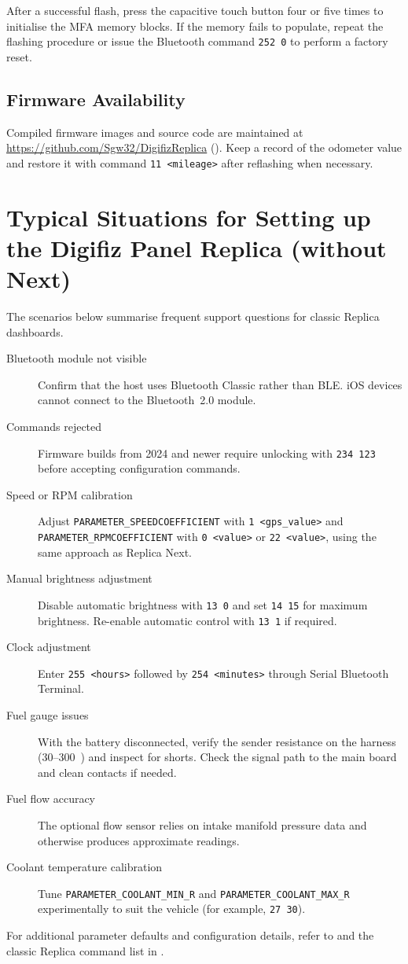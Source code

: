 After a successful flash, press the capacitive touch button four or five times to initialise the MFA memory blocks.
If the memory fails to populate, repeat the flashing procedure or issue the Bluetooth command \verb|252 0| to perform a factory reset.

\section{Firmware Availability}

Compiled firmware images and source code are maintained at \url{https://github.com/Sgw32/DigifizReplica} ().
Keep a record of the odometer value and restore it with command \verb|11 <mileage>| after reflashing when necessary.

\chapter{Typical Situations for Setting up the Digifiz Panel Replica (without Next)} \label{ch:replica-scenarios}

The scenarios below summarise frequent support questions for classic Replica dashboards.

\begin{description}
    \item[Bluetooth module not visible] Confirm that the host uses Bluetooth Classic rather than BLE.
          iOS devices cannot connect to the Bluetooth~2.0 module.
    \item[Commands rejected] Firmware builds from 2024 and newer require unlocking with \verb|234 123| before accepting configuration commands.
    \item[Speed or RPM calibration] Adjust \texttt{PARAMETER\_SPEEDCOEFFICIENT} with \verb|1 <gps_value>| and \texttt{PARAMETER\_RPMCOEFFICIENT} with \verb|0 <value>| or \verb|22 <value>|, using the same approach as Replica Next.
    \item[Manual brightness adjustment] Disable automatic brightness with \verb|13 0| and set \verb|14 15| for maximum brightness.
          Re-enable automatic control with \verb|13 1| if required.
    \item[Clock adjustment] Enter \verb|255 <hours>| followed by \verb|254 <minutes>| through Serial Bluetooth Terminal.
    \item[Fuel gauge issues] With the battery disconnected, verify the sender resistance on the harness (30--300~\ohm{}) and inspect for shorts.
          Check the signal path to the main board and clean contacts if needed.
    \item[Fuel flow accuracy] The optional flow sensor relies on intake manifold pressure data and otherwise produces approximate readings.
    \item[Coolant temperature calibration] Tune \texttt{PARAMETER\_COOLANT\_MIN\_R} and \texttt{PARAMETER\_COOLANT\_MAX\_R} experimentally to suit the vehicle (for example, \verb|27 30|).
\end{description}

For additional parameter defaults and configuration details, refer to  and the classic Replica command list in .
